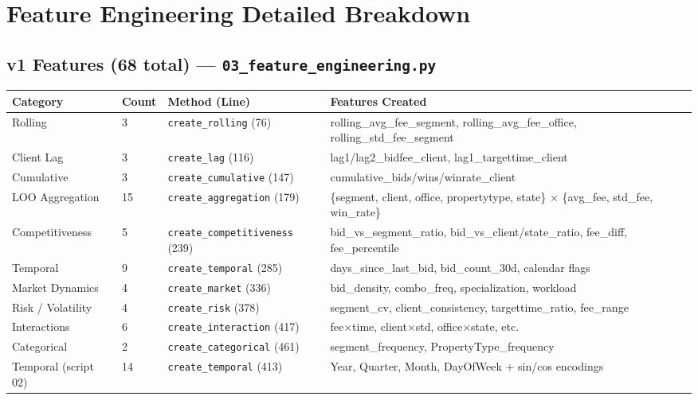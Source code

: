\documentclass[11pt,a4paper]{article}
\newcommand{\file}[1]{\texttt{\color{gssblue!70!black}#1}}
\newcommand{\func}[1]{\texttt{\color{gssgreen!80!black}#1}}
\begin{document}
\section{Feature Engineering Detailed Breakdown}
\label{sec:features}

\subsection{v1 Features (68 total) --- \file{03\_feature\_engineering.py}}

\begin{longtable}{l l l p{4cm}}
\toprule
\textbf{Category} & \textbf{Count} & \textbf{Method (Line)} & \textbf{Features Created} \\
\midrule
\endhead
Rolling & 3 & \func{create\_rolling} (76) & rolling\_avg\_fee\_segment, rolling\_avg\_fee\_office, rolling\_std\_fee\_segment \\
Client Lag & 3 & \func{create\_lag} (116) & lag1/lag2\_bidfee\_client, lag1\_targettime\_client \\
Cumulative & 3 & \func{create\_cumulative} (147) & cumulative\_bids/wins/winrate\_client \\
LOO Aggregation & 15 & \func{create\_aggregation} (179) & \{segment, client, office, propertytype, state\} $\times$ \{avg\_fee, std\_fee, win\_rate\} \\
Competitiveness & 5 & \func{create\_competitiveness} (239) & bid\_vs\_segment\_ratio, bid\_vs\_client/state\_ratio, fee\_diff, fee\_percentile \\
Temporal & 9 & \func{create\_temporal} (285) & days\_since\_last\_bid, bid\_count\_30d, calendar flags \\
Market Dynamics & 4 & \func{create\_market} (336) & bid\_density, combo\_freq, specialization, workload \\
Risk / Volatility & 4 & \func{create\_risk} (378) & segment\_cv, client\_consistency, targettime\_ratio, fee\_range \\
Interactions & 6 & \func{create\_interaction} (417) & fee$\times$time, client$\times$std, office$\times$state, etc. \\
Categorical & 2 & \func{create\_categorical} (461) & segment\_frequency, PropertyType\_frequency \\
Temporal (script 02) & 14 & \func{create\_temporal} (413) & Year, Quarter, Month, DayOfWeek + sin/cos encodings \\
\bottomrule
\end{longtable}
\end{document}
